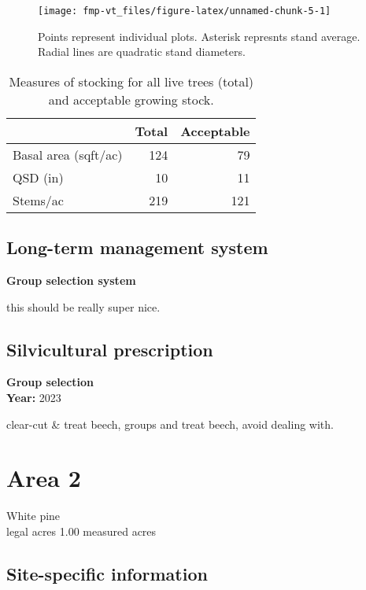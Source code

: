 \documentclass[]{tufte-handout}
\begin{document}
\begin{figure}
\texttt{[image: fmp-vt\_files/figure-latex/unnamed-chunk-5-1]} \caption[Points represent individual plots]{Points represent individual plots. Asterisk represnts stand average. Radial lines are quadratic stand diameters.}\label{fig:unnamed-chunk-5}
\end{figure}

\begin{table}

\caption{\label{tab:unnamed-chunk-6}Measures of stocking for all live trees (total) and acceptable growing stock.}
\centering
\begin{tabular}[t]{lrr}
\toprule
  & Total & Acceptable\\
\midrule
Basal area (sqft/ac) & 124 & 79\\
QSD (in) & 10 & 11\\
Stems/ac & 219 & 121\\
\bottomrule
\end{tabular}
\end{table}

\subsection{Long-term management
system}\label{long-term-management-system}

\textbf{Group selection system}

this should be really super nice.

\subsection{Silvicultural
prescription}\label{silvicultural-prescription}

\textbf{Group selection}\\
\noindent \textbf{Year:} 2023

clear-cut \& treat beech, groups and treat beech, avoid dealing with.

\newpage

\section{Area 2}\label{area-2}

White pine\\
 legal acres \textbar{} 1.00 measured acres

\subsection{Site-specific
information}\label{site-specific-information-1}
\end{document}
